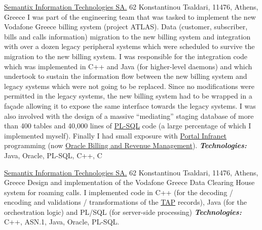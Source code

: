 \documentclass[helvetica,english,logo,notitle,totpages,utf8]{europecv2013}
\newcommand{\technologies}[0]{\textbf{\textit{Technologies:}}}
\begin{document}
\begin{europecv}
                   {\href{http://www.semantix.gr}{Semantix Information Technologies SA.}}
                   {62 Konstantinou Tsaldari, 11476, Athens, Greece}
                   {
    I was part of the engineering team that was tasked to implement the new Vodafone Greece billing system (project ATLAS).
    Data (customer, subscriber, bills and
    calls information) migration to the new billing system and integration with over a dozen legacy
    peripheral systems which were scheduled to survive the migration to the new billing system.
    I was responsible for the integration code which was implemented in
    C++ and Java (for higher-level daemons) and which undertook to sustain the information flow between the
    new billing system and legacy systems which were not going to be replaced. Since no modifications were
    permitted in the legacy systems, the new billing system had to be wrapped in a fa\c{c}ade allowing it to
    expose the same interface towards the legacy systems.
    I was also involved with the design of a massive ``mediating'' staging database of more
    than 400 tables and 40,000 lines of \href{https://en.wikipedia.org/wiki/PL/SQL}{PL-SQL} code
    (a large percentage of which I implemented myself).
    Finally I had small exposure with \href{https://en.wikipedia.org/wiki/Portal_Software}{Portal Infranet} programming
    (now \href{http://www.orafaq.com/wiki/BRM}{Oracle Billing and Revenue Management}).
    \technologies{} Java, Oracle, PL-SQL, C++, C
                   }                   

                   {\href{http://www.semantix.gr}{Semantix Information Technologies SA.}}
                   {62 Konstantinou Tsaldari, 11476, Athens, Greece}
                   {
    Design and implementation of the Vodafone Greece Data Clearing House system for roaming calls.
    I implemented code in C++ (for the decoding / encoding and validations / transformations
    of the \href{http://what-when-how.com/roaming-in-wireless-networks/transferred-account-procedures-billing-and-settlement/}{TAP} records), Java (for the orchestration logic) and PL/SQL (for server-side processing)
    \technologies{} C++, ASN.1, Java, Oracle, PL-SQL.
                   }                   
                   


\end{europecv}
\end{document}
